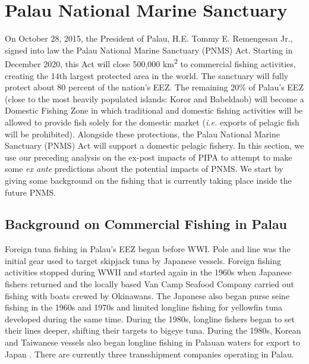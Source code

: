 \documentclass[9pttwoside,lineno]{pnas-new}
\begin{document}
\clearpage

\section{Palau National Marine Sanctuary}\label{PNMS}


On October 28, 2015, the President of Palau, H.E. Tommy E. Remengesau Jr., signed into law the Palau National Marine Sanctuary (PNMS) Act. Starting in December 2020, this Act will close 500,000 km\textsuperscript{2} to commercial fishing activities, creating the 14th largest protected area in the world. The sanctuary will fully protect about 80 percent of the nation’s EEZ. The remaining 20\% of Palau’s EEZ (close to the most heavily populated islands: Koror and Babeldaob) will become a Domestic Fishing Zone in which traditional and domestic fishing activities will be allowed to provide fish solely for the domestic market (\emph{i.e.} exports of pelagic fish will be prohibited). Alongside these protections, the Palau National Marine Sanctuary (PNMS) Act will support a domestic pelagic fishery. In this section, we use our preceding analysis on the ex-post impacts of PIPA to attempt to make some \emph{ex ante} predictions about the potential impacts of PNMS. We start by giving some background on the fishing that is currently taking place inside the future PNMS. 

\subsection{Background on Commercial Fishing in Palau}\label{Palau_back}

Foreign tuna fishing in Palau’s EEZ began before WWI. Pole and line was the initial gear used to target skipjack tuna by Japanese vessels. Foreign fishing activities stopped during WWII and started again in the 1960s when Japanese fishers returned and the locally based Van Camp Seafood Company carried out fishing with boats crewed by Okinawans. The Japanese also began purse seine fishing in the 1960s and 1970s and limited longline fishing for yellowfin tuna developed during the same time. During the 1980s, longline fishers began to set their lines deeper, shifting their targets to bigeye tuna. During the 1980s, Korean and Taiwanese vessels also began longline fishing in Palauan waters for export to Japan \citep{chapman2000development}. There are currently three transshipment companies operating in Palau.
\end{document}
